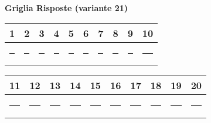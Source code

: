 \documentclass{exam}%
\newcounter{variant}%
\begin{document}
%
\normalsize%
\setcounter{variant}{21}%
\noindent \textbf{  }%
\bigskip%
\noindent\textbf{Griglia Risposte (variante 21)}%
\begin{center}
\begin{tabular}{|c|c|c|c|c|c|c|c|c|c|}
\hline
1 & 2 & 3 & 4 & 5 & 6 & 7 & 8 & 9 & 10 \\ \hline
\rule{1cm}{0pt}\rule[-0.5em]{0pt}{1.5em} & \rule{1cm}{0pt}\rule[-0.5em]{0pt}{1.5em} & \rule{1cm}{0pt}\rule[-0.5em]{0pt}{1.5em} & \rule{1cm}{0pt}\rule[-0.5em]{0pt}{1.5em} & \rule{1cm}{0pt}\rule[-0.5em]{0pt}{1.5em} & \rule{1cm}{0pt}\rule[-0.5em]{0pt}{1.5em} & \rule{1cm}{0pt}\rule[-0.5em]{0pt}{1.5em} & \rule{1cm}{0pt}\rule[-0.5em]{0pt}{1.5em} & \rule{1cm}{0pt}\rule[-0.5em]{0pt}{1.5em} & \rule{1cm}{0pt}\rule[-0.5em]{0pt}{1.5em} \\ \hline
\end{tabular}
\end{center}%
\vspace{0.3em}%
\begin{center}
\begin{tabular}{|c|c|c|c|c|c|c|c|c|c|}
\hline
11 & 12 & 13 & 14 & 15 & 16 & 17 & 18 & 19 & 20 \\ \hline
\rule{1cm}{0pt}\rule[-0.5em]{0pt}{1.5em} & \rule{1cm}{0pt}\rule[-0.5em]{0pt}{1.5em} & \rule{1cm}{0pt}\rule[-0.5em]{0pt}{1.5em} & \rule{1cm}{0pt}\rule[-0.5em]{0pt}{1.5em} & \rule{1cm}{0pt}\rule[-0.5em]{0pt}{1.5em} & \rule{1cm}{0pt}\rule[-0.5em]{0pt}{1.5em} & \rule{1cm}{0pt}\rule[-0.5em]{0pt}{1.5em} & \rule{1cm}{0pt}\rule[-0.5em]{0pt}{1.5em} & \rule{1cm}{0pt}\rule[-0.5em]{0pt}{1.5em} & \rule{1cm}{0pt}\rule[-0.5em]{0pt}{1.5em} \\ \hline
\end{tabular}
\end{center}%
\vspace{1em}%
\end{document}
